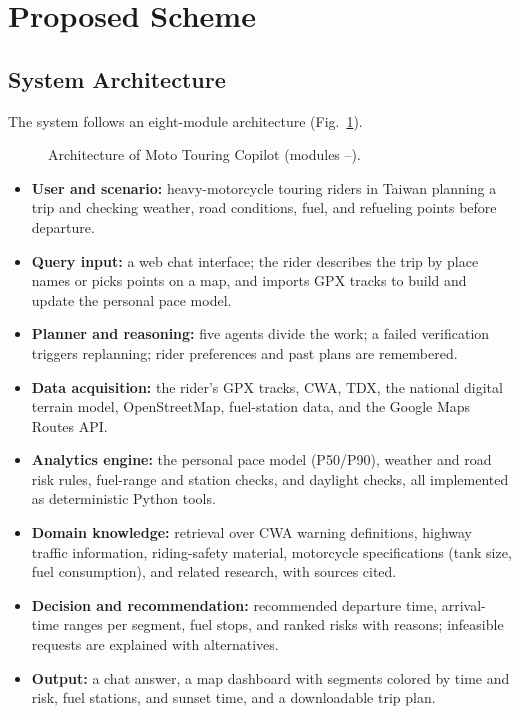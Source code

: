 \section{Proposed Scheme}
\label{sec:scheme}

\subsection{System Architecture}

The system follows an eight-module architecture (Fig.~\ref{fig:arch}).

\begin{figure}[!t]
\centering
{}
\caption{Architecture of Moto Touring Copilot (modules --).}
\label{fig:arch}
\end{figure}

\begin{itemize}
  \item[\ding{172}] \textbf{User and scenario:} heavy-motorcycle touring riders in Taiwan planning a trip and checking weather, road conditions, fuel, and refueling points before departure.
  \item[\ding{173}] \textbf{Query input:} a web chat interface; the rider describes the trip by place names or picks points on a map, and imports GPX tracks to build and update the personal pace model.
  \item[\ding{174}] \textbf{Planner and reasoning:} five agents divide the work; a failed verification triggers replanning; rider preferences and past plans are remembered.
  \item[\ding{175}] \textbf{Data acquisition:} the rider's GPX tracks, CWA, TDX, the national digital terrain model, OpenStreetMap, fuel-station data, and the Google Maps Routes API.
  \item[\ding{176}] \textbf{Analytics engine:} the personal pace model (P50/P90), weather and road risk rules, fuel-range and station checks, and daylight checks, all implemented as deterministic Python tools.
  \item[\ding{177}] \textbf{Domain knowledge:} retrieval over CWA warning definitions, highway traffic information, riding-safety material, motorcycle specifications (tank size, fuel consumption), and related research, with sources cited.
  \item[\ding{178}] \textbf{Decision and recommendation:} recommended departure time, arrival-time ranges per segment, fuel stops, and ranked risks with reasons; infeasible requests are explained with alternatives.
  \item[\ding{179}] \textbf{Output:} a chat answer, a map dashboard with segments colored by time and risk, fuel stations, and sunset time, and a downloadable trip plan.
\end{itemize}

